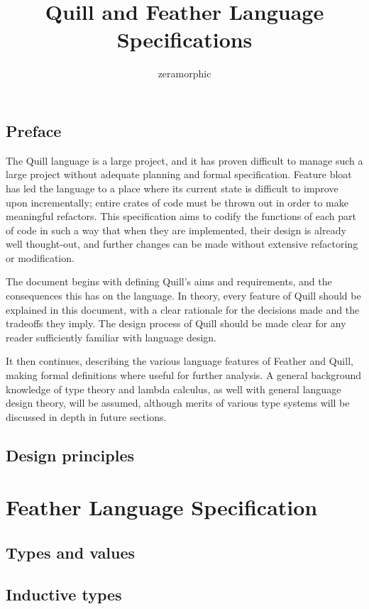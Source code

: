 \documentclass[11pt]{book}
\title{Quill and Feather Language Specifications}
\author{zeramorphic}
\begin{document}
\frontmatter

\maketitle

\tableofcontents

\chapter{Preface}

The Quill language is a large project, and it has proven difficult to manage such a large project without adequate planning and formal specification.
Feature bloat has led the language to a place where its current state is difficult to improve upon incrementally; entire crates of code must be thrown out in order to make meaningful refactors.
This specification aims to codify the functions of each part of code in such a way that when they are implemented, their design is already well thought-out, and further changes can be made without extensive refactoring or modification.

The document begins with defining Quill's aims and requirements, and the consequences this has on the language.
In theory, every feature of Quill should be explained in this document, with a clear rationale for the decisions made and the tradeoffs they imply.
The design process of Quill should be made clear for any reader sufficiently familiar with language design.

It then continues, describing the various language features of Feather and Quill, making formal definitions where useful for further analysis.
A general background knowledge of type theory and lambda calculus, as well with general language design theory, will be assumed, although merits of various type systems will be discussed in depth in future sections.

\chapter{Design principles}
\label{ch:design_principles}


\mainmatter

\part{Feather Language Specification}

\chapter{Types and values}
\label{ch:types_and_values}


\chapter{Inductive types}
\label{ch:inductive_types}


\backmatter

\printbibliography
\end{document}
